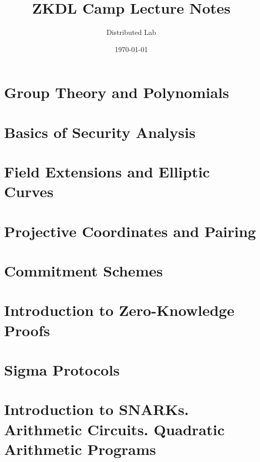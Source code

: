 \documentclass{zkdl-template}
\title{\huge\sffamily\bfseries ZKDL Camp Lecture Notes}
\author{\Large\sffamily Distributed Lab}
\date{\sffamily \today}
\begin{document}
\pagestyle{fancy}

\maketitle

\pagebreak

\tableofcontents

\pagebreak

\section{Group Theory and Polynomials}



\section{Basics of Security Analysis}\label{section:math-crypto-2}



\section{Field Extensions and Elliptic Curves}



\section{Projective Coordinates and Pairing}



\section{Commitment Schemes}



\section{Introduction to Zero-Knowledge Proofs}



\section{Sigma Protocols}



\section{Introduction to SNARKs. Arithmetic Circuits. Quadratic Arithmetic Programs}


\end{document}
